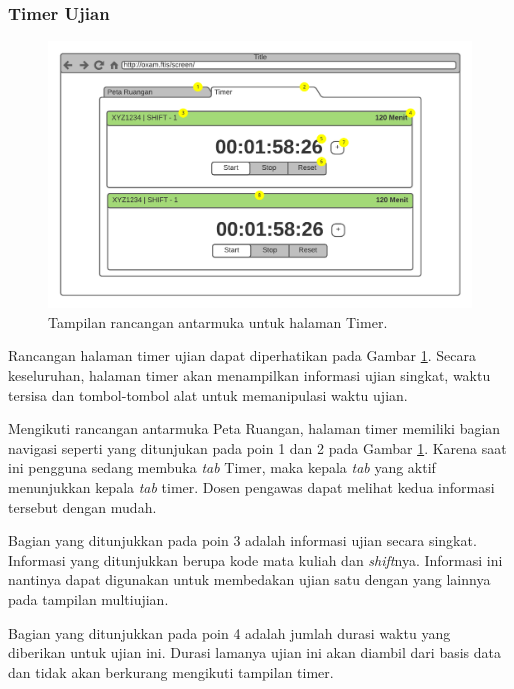\subsubsection{Timer Ujian}
    \begin{figure}
        \centering
        \includegraphics[width=0.7\paperwidth]{Gambar/mockups/Mockup--DosenPengawas - Timer.pdf}
        \caption{Tampilan rancangan antarmuka untuk halaman Timer.}
        \label{fig:mockup_dosen_timer}
    \end{figure}
    Rancangan halaman timer ujian dapat diperhatikan pada Gambar \ref{fig:mockup_dosen_timer}.
    Secara keseluruhan, halaman timer akan menampilkan informasi ujian singkat, waktu tersisa
    dan tombol-tombol alat untuk memanipulasi waktu ujian.
    
    Mengikuti rancangan antarmuka Peta Ruangan, halaman timer memiliki bagian navigasi seperti
    yang ditunjukan pada poin 1 dan 2 pada Gambar \ref{fig:mockup_dosen_timer}. Karena saat ini
    pengguna sedang membuka \textit{tab} Timer, maka kepala \textit{tab} yang aktif menunjukkan
    kepala \textit{tab} timer. Dosen pengawas dapat melihat kedua informasi tersebut dengan mudah.
    
    Bagian yang ditunjukkan pada poin 3 adalah informasi ujian secara singkat. Informasi yang ditunjukkan
    berupa kode mata kuliah dan \textit{shift}nya. Informasi ini nantinya dapat digunakan untuk membedakan
    ujian satu dengan yang lainnya pada tampilan multiujian.
    
    Bagian yang ditunjukkan pada poin 4 adalah jumlah durasi waktu yang diberikan untuk ujian ini. Durasi
    lamanya ujian ini akan diambil dari basis data dan tidak akan berkurang mengikuti tampilan timer.
    
